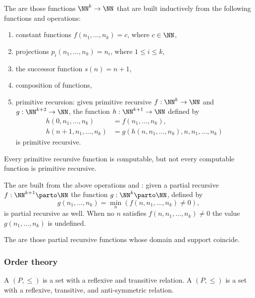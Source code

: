 The  are those functions $\NN^k \to
\NN$ that are built inductively from the following functions and operations:
%
\begin{enumerate}
\item constant functions $f(n_1, \ldots, n_k) = c$, where $c \in \NN$,
\item projections $p_i(n_1, \ldots, n_k) = n_i$, where $1 \leq i \leq k$,
\item the successor function $s(n) = n + 1$,
\item composition of functions,
\item primitive recursion: given primitive recursive $f : \NN^k \to
  \NN$ and $g : \NN^{k+2} \to \NN$, the function $h : \NN^{k+1} \to
  \NN$ defined by
  \begin{align*}
    h(0, n_1, \ldots, n_k) &= f(n_1, \ldots, n_k), \\
    h(n+1, n_1, \ldots, n_k) &= g(h(n, n_1, \ldots, n_k), n, n_1,
    \ldots, n_k)    
  \end{align*}
  is primitive recursive.
\end{enumerate}
%
Every primitive recursive function is computable, but not every
computable function is primitive recursive.


The  are built from the above operations and : given a partial recursive $f : \NN^{k+1} \parto \NN$ the function $g : \NN^k \parto \NN$, defined by
%
\begin{equation*}
  g(n_1, \ldots, n_k) = \min_n (f(n, n_1, \ldots, n_k) \neq 0),
\end{equation*}
%
is partial recursive as well. When no $n$ satisfies $f(n, n_1, \ldots, n_k) \neq 0$ the value $g(n_1, \ldots, n_k)$ is undefined.

The  are those partial recursive functions whose domain and support coincide.


\subsubsection*{Order theory}

A  $(P, {\leq})$ is a set with a reflexive and
transitive relation.
%
A  $(P, {\leq})$ is a set with a
reflexive, transitive, and anti-symmetric relation.

